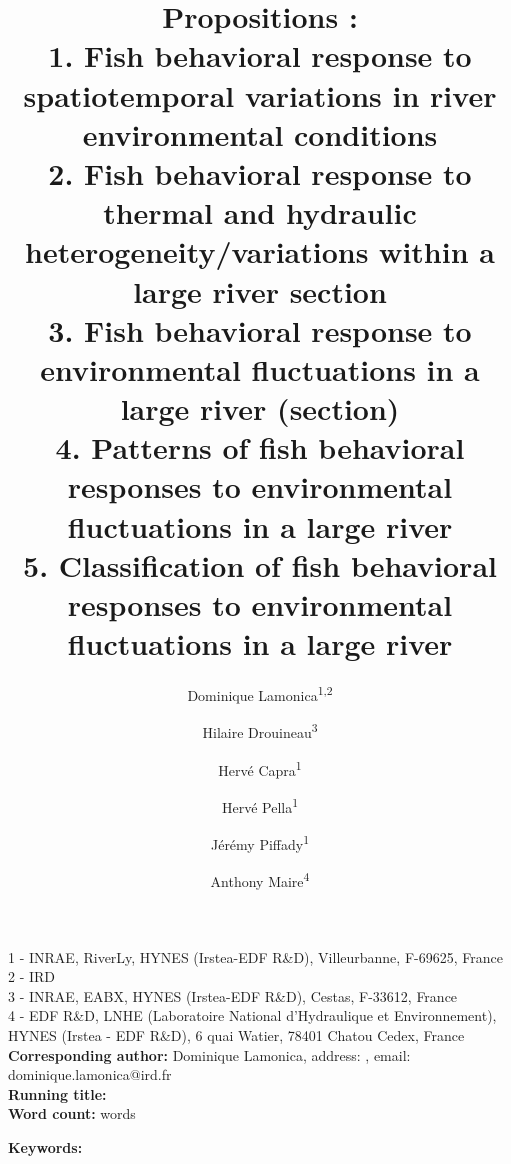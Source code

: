 \documentclass{article}
\title{Propositions : \\
1. Fish behavioral response to spatiotemporal variations in river environmental conditions \\
2. Fish behavioral response to thermal and hydraulic heterogeneity/variations within a large river section \\
3. Fish behavioral response to environmental fluctuations in a large river (section)\\
4. Patterns of fish behavioral responses to environmental fluctuations in a large river \\
5. Classification of fish behavioral responses to environmental fluctuations in a large river}
\date{}
\author{Dominique Lamonica\textsuperscript{1,2} \and Hilaire Drouineau\textsuperscript{3}  \and  Herv\'e Capra\textsuperscript{1} \and   Herv\'e Pella\textsuperscript{1} \and J\'er\'emy Piffady\textsuperscript{1} \and Anthony Maire\textsuperscript{4}}
\begin{document}
\maketitle

1 - INRAE, RiverLy, HYNES (Irstea-EDF R\&D), Villeurbanne, F-69625, France\\
2 - IRD\\
3 - INRAE, EABX, HYNES (Irstea-EDF R\&D), Cestas, F-33612, France\\
4 - EDF R\&D, LNHE (Laboratoire National d'Hydraulique et Environnement), HYNES (Irstea - EDF R\&D), 6 quai Watier, 78401 Chatou Cedex, France\\

{\bf Corresponding author:} Dominique Lamonica, address: , email: dominique.lamonica@ird.fr\\

{\bf Running title:} \\

{\bf Word count:}  words


{\bf Keywords:} 
\end{document}
